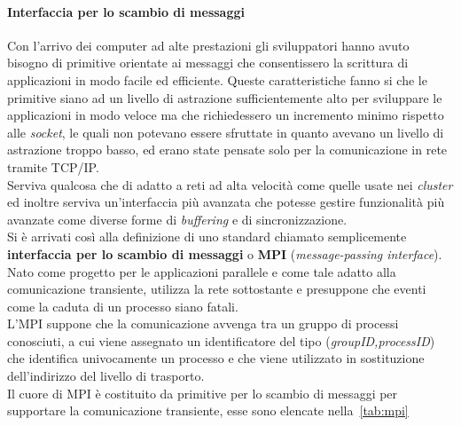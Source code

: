 \paragraph{Interfaccia per lo scambio di messaggi}
Con l'arrivo dei computer ad alte prestazioni gli sviluppatori hanno avuto bisogno di primitive orientate ai messaggi  che consentissero la scrittura di applicazioni in modo facile ed efficiente. Queste caratteristiche fanno si che le primitive siano ad un livello di astrazione sufficientemente alto per sviluppare le applicazioni in modo veloce ma che richiedessero un incremento minimo rispetto alle \emph{socket}, le quali non potevano essere sfruttate in quanto avevano un livello di astrazione troppo basso, ed erano state pensate solo per la comunicazione in rete tramite TCP/IP.\\
Serviva qualcosa che di adatto a reti ad alta velocità come quelle usate nei \emph{cluster} ed inoltre serviva un'interfaccia più avanzata che potesse gestire funzionalità più avanzate come diverse forme di \emph{buffering} e di sincronizzazione.\\
Si è arrivati così alla definizione di uno standard chiamato semplicemente \textbf{interfaccia per lo scambio di messaggi} o \textbf{MPI} (\emph{message-passing interface}). Nato come progetto per le applicazioni parallele e come tale adatto alla comunicazione transiente, utilizza la rete sottostante e presuppone che eventi come la caduta di un processo siano fatali.\\
L'MPI suppone che la comunicazione avvenga tra un gruppo di processi conosciuti, a cui viene assegnato un identificatore  del tipo (\emph{groupID,processID}) che identifica univocamente un processo e che viene utilizzato in sostituzione dell'indirizzo del livello di trasporto.\\
Il cuore di MPI è costituito da primitive per lo scambio di messaggi per supportare la comunicazione transiente, esse sono elencate nella \tablename\,\ref{tab:mpi}
